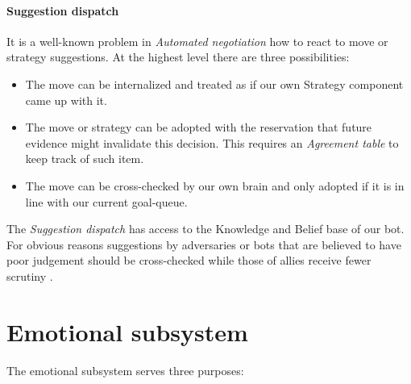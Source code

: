 \documentclass[pdftex,11pt,a4paper]{report}
\begin{document}
\paragraph{Suggestion dispatch}
It is a well-known problem in \textit{Automated negotiation} how 
to react to move or strategy suggestions. At the highest level there
are three possibilities:

\begin{itemize}

\item The move can be internalized and treated as if our own 
      Strategy component came up with it. 

\item The move or strategy can be adopted with the reservation 
      that future evidence might invalidate this decision. This 
      requires an \textit{Agreement table} to keep track of such
      item.

\item The move can be cross-checked by our own brain and only 
      adopted if it is in line with our current goal-queue. 

\end{itemize}

The \textit{Suggestion dispatch} has access to the Knowledge and
Belief base of our bot. For obvious reasons suggestions by
adversaries or bots that are believed to have poor judgement 
should be cross-checked while those of allies receive fewer
scrutiny . \\

\section{Emotional subsystem}

The emotional subsystem serves three purposes:
\end{document}
